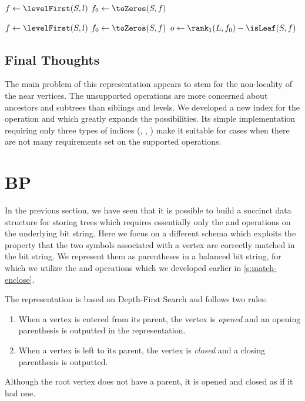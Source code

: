 \begin{algorithmic}	
 
	\State $f \gets \levelFirst(S, l)$ 
	\State $f_0 \gets \toZeros(S, f)$
	\State {}
\EndFunction
\end{algorithmic}

\begin{algorithmic}
	\State $f \gets \levelFirst(S, l)$ 
	\State $f_0 \gets \toZeros(S, f)$
	\State $o \gets \rank_1(L, f_0) - \isLeaf(S, f)$ 
	\State {}
\EndFunction
\end{algorithmic}

\subsection{Final Thoughts}

The main problem of this representation appears to stem for the non-locality of the near vertices.
The unsupported operations are more concerned about ancestors and subtrees than siblings and levels.
We developed a new index for the operation \dep{} and \levelAny{} which greatly expands the possibilities.
Its simple implementation requiring only three types of indices (\rank{}, \select{}, \blockOfD{}) make it suitable for cases when there are not many requirements set on the supported operations.

\section{BP}

In the previous section, we have seen that it is possible to build a succinct data structure for storing trees which requires essentially only the \rank{} and \select{} operations on the underlying bit string.
Here we focus on a different schema which exploits the property that the two symbols associated with a vertex are correctly matched in the bit string.
We represent them as parentheses in a balanced bit string, for which we utilize the \match{} and \enclose{} operations which we developed earlier in \ref{s:match-enclose}.

The representation is based on Depth-First Search and follows two rules:
\begin{enumerate}
	\item When a vertex is entered from its parent, the vertex is \emph{opened} and an opening parenthesis is outputted in the representation.
	\item When a vertex is left to its parent, the vertex is \emph{closed} and a closing parenthesis is outputted.
\end{enumerate}
Although the root vertex does not have a parent, it is opened and closed as if it had one.


